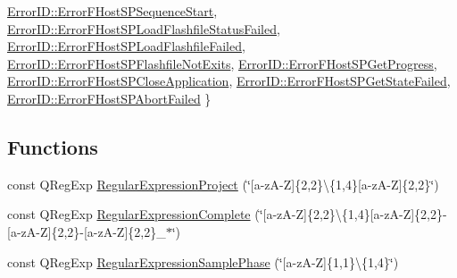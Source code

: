 \begin{DoxyCompactItemize}
\hyperlink{namespace_r_w_1_1_c_o_r_e_adc31704b5171629bde8ad1b0badc49d4a5d1f54c733c971f9652069e6334dc295}{Error\+I\+D\+::\+Error\+F\+Host\+S\+P\+Sequence\+Start}, 
\newline
\hyperlink{namespace_r_w_1_1_c_o_r_e_adc31704b5171629bde8ad1b0badc49d4ad4f043489b9b90978e2cab65d0964382}{Error\+I\+D\+::\+Error\+F\+Host\+S\+P\+Load\+Flashfile\+Status\+Failed}, 
\hyperlink{namespace_r_w_1_1_c_o_r_e_adc31704b5171629bde8ad1b0badc49d4a1da6e55d019a8298dcfdb47e7818689a}{Error\+I\+D\+::\+Error\+F\+Host\+S\+P\+Load\+Flashfile\+Failed}, 
\hyperlink{namespace_r_w_1_1_c_o_r_e_adc31704b5171629bde8ad1b0badc49d4a12ecaf63d3eaea1a1ff04f7bc0c593e2}{Error\+I\+D\+::\+Error\+F\+Host\+S\+P\+Flashfile\+Not\+Exits}, 
\hyperlink{namespace_r_w_1_1_c_o_r_e_adc31704b5171629bde8ad1b0badc49d4a9b494a5bb0810aa0cc1f7100f35b7988}{Error\+I\+D\+::\+Error\+F\+Host\+S\+P\+Get\+Progress}, 
\newline
\hyperlink{namespace_r_w_1_1_c_o_r_e_adc31704b5171629bde8ad1b0badc49d4a2f05de453407ec05df087462a416d0c9}{Error\+I\+D\+::\+Error\+F\+Host\+S\+P\+Close\+Application}, 
\hyperlink{namespace_r_w_1_1_c_o_r_e_adc31704b5171629bde8ad1b0badc49d4af6389f23c6f53163ef63a17a357452f5}{Error\+I\+D\+::\+Error\+F\+Host\+S\+P\+Get\+State\+Failed}, 
\hyperlink{namespace_r_w_1_1_c_o_r_e_adc31704b5171629bde8ad1b0badc49d4a8726d6b328c4beb34762e3f02da1cf72}{Error\+I\+D\+::\+Error\+F\+Host\+S\+P\+Abort\+Failed}
 \}
\end{DoxyCompactItemize}
\subsection*{Functions}
\begin{DoxyCompactItemize}
\item 
const Q\+Reg\+Exp \hyperlink{namespace_r_w_1_1_c_o_r_e_ab0555e52caff872d40392a747e32cada}{Regular\+Expression\+Project} (\char`\"{}\mbox{[}a-\/zA-\/Z\mbox{]}\{2,2\}\textbackslash{}\{1,4\}\mbox{[}a-\/zA-\/Z\mbox{]}\{2,2\}\char`\"{})
\item 
const Q\+Reg\+Exp \hyperlink{namespace_r_w_1_1_c_o_r_e_a072c68b892ac66de767756f8d36d1b2c}{Regular\+Expression\+Complete} (\char`\"{}\mbox{[}a-\/zA-\/Z\mbox{]}\{2,2\}\textbackslash{}\{1,4\}\mbox{[}a-\/zA-\/Z\mbox{]}\{2,2\}-\/\mbox{[}a-\/zA-\/Z\mbox{]}\{2,2\}-\/\mbox{[}a-\/zA-\/Z\mbox{]}\{2,2\}\+\_\+$\ast$\char`\"{})
\item 
const Q\+Reg\+Exp \hyperlink{namespace_r_w_1_1_c_o_r_e_aa75ce6c9ceaa39499c64b959ab78c7ea}{Regular\+Expression\+Sample\+Phase} (\char`\"{}\mbox{[}a-\/zA-\/Z\mbox{]}\{1,1\}\textbackslash{}\{1,4\}\char`\"{})
\end{DoxyCompactItemize}
